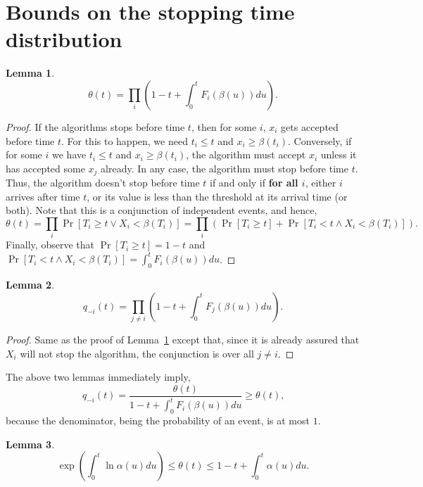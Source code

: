 \documentclass[10pt, letterpaper, twoside]{article}
\newtheorem{lemma}{Lemma}
\begin{document}
\section{Bounds on the stopping time distribution}

\begin{lemma}\label{lem_theta}
\[\theta(t)=\prod_i\left(1-t+\int_0^tF_i(\beta(u))du\right)\text{.}\]
\end{lemma}

\begin{proof}
If the algorithms stops before time $t$, then for some $i$, $x_i$ gets accepted before time $t$. For this to happen, we need $t_i\leq t$ and $x_i\geq\beta(t_i)$. Conversely, if for some $i$ we have $t_i\leq t$ and $x_i\geq\beta(t_i)$, the algorithm must accept $x_i$ unless it has accepted some $x_j$ already. In any case, the algorithm must stop before time $t$. Thus, the algorithm doesn't stop before time $t$ if and only if \textbf{for all $i$}, either $i$ arrives after time $t$, or its value is less than the threshold at its arrival time (or both). Note that this is a conjunction of independent events, and hence,
\[\theta(t)=\prod_i\Pr[T_i\geq t\vee X_i<\beta(T_i)]=\prod_i\left(\Pr[T_i\geq t]+\Pr[T_i<t\wedge X_i<\beta(T_i)]\right)\text{.}\]
Finally, observe that $\Pr[T_i\geq t]=1-t$ and $\Pr[T_i<t\wedge X_i<\beta(T_i)]=\int_0^tF_i(\beta(u))du$.
\end{proof}

\begin{lemma}
\[q_{-i}(t)=\prod_{j\neq i}\left(1-t+\int_0^tF_j(\beta(u))du\right)\text{.}\]
\end{lemma}

\begin{proof}
Same as the proof of Lemma~\ref{lem_theta} except that, since it is already assured that $X_i$ will not stop the algorithm, the conjunction is over all $j\neq i$.
\end{proof}

The above two lemmas immediately imply,
\begin{equation}\label{eqn_q_theta}
q_{-i}(t)=\frac{\theta(t)}{1-t+\int_0^tF_i(\beta(u))du}\geq\theta(t)\text{,}
\end{equation}
because the denominator, being the probability of an event, is at most $1$.

\begin{lemma}\label{lem_theta_bounds}
\[\exp\left(\int_0^t\ln\alpha(u)du\right)\leq\theta(t)\leq1-t+\int_0^t\alpha(u)du\text{.}\]
\end{lemma}
\end{document}
